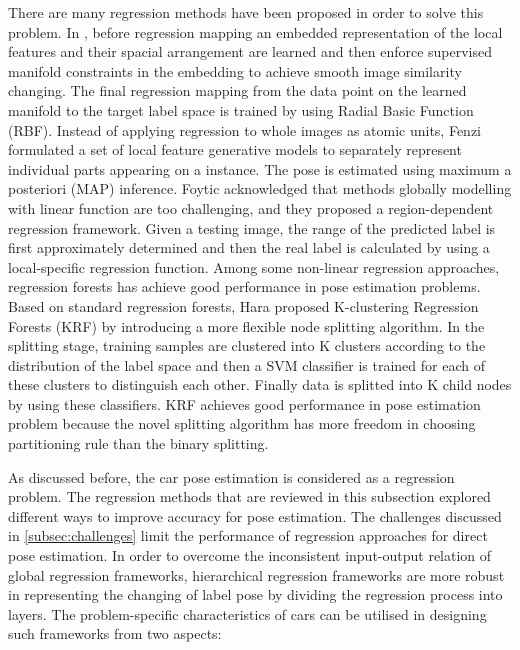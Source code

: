 \documentclass{tutmscthesis}[2010/09/22]
\numberwithin{equation}{section}
\numberwithin{table}{section}
\numberwithin{figure}{section}
\begin{document}
There are many regression methods have been proposed in order to solve this problem. 
In \cite{torki2011regression}, before regression mapping an embedded representation of the local features  and their spacial arrangement are learned and then enforce supervised manifold constraints in the embedding to achieve smooth image similarity changing. 
The final regression mapping from the data point on the learned manifold to the target label space is trained by using Radial Basic Function (RBF). 
Instead of applying regression to whole images as atomic units, Fenzi \cite{fenzi2013class} formulated a set of local feature generative models to separately represent individual parts appearing on a instance.
The pose is estimated using maximum a posteriori (MAP) inference. 
Foytic \cite{foytik2013two} acknowledged that methods globally modelling with linear function are too challenging, and they proposed a region-dependent regression framework. 
Given a testing image, the range of the predicted label is first approximately determined and then the real label is calculated by using a local-specific regression function. 
Among some non-linear regression approaches, regression forests has achieve good performance in pose estimation problems.
Based on standard regression forests, Hara \cite{hara2014growing} proposed K-clustering Regression Forests (KRF) by introducing a more flexible node splitting algorithm. 
In the splitting stage, training samples are clustered into K clusters according to the distribution of the label space and then a SVM classifier is trained for each of these clusters to distinguish each other. 
Finally data is splitted into K child nodes by using these classifiers.
KRF achieves good performance in pose estimation problem because the novel splitting algorithm has more freedom in choosing partitioning rule than the binary splitting. 

 
As discussed before, the car pose estimation is considered as a regression problem. 
The regression methods that are reviewed in this subsection explored different ways to improve accuracy for pose estimation. 
The challenges discussed in \ref{subsec:challenges} limit the performance of regression approaches for direct pose estimation.
In order to overcome the inconsistent input-output relation of global regression frameworks, hierarchical regression frameworks are more robust in representing the changing of label pose by dividing the regression process into layers.
The problem-specific characteristics of cars can be utilised in designing such frameworks from two aspects:
\end{document}
